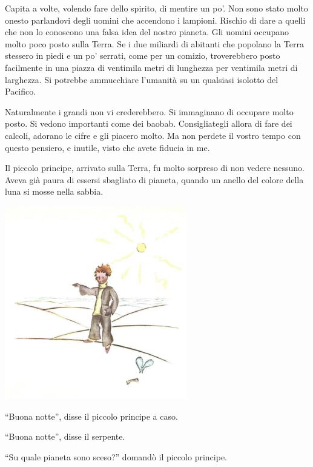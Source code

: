 \documentclass[11pt]{scrbook}
\begin{document}
Capita a volte, volendo fare dello spirito, di mentire un po'. Non sono stato molto onesto parlandovi degli uomini che accendono i lampioni. Rischio di dare a quelli che non lo conoscono una falsa idea del nostro pianeta. Gli uomini occupano molto poco posto sulla Terra. Se i due miliardi di abitanti che popolano la Terra stessero in piedi e un po' serrati, come per un comizio, troverebbero posto facilmente in una piazza di ventimila metri di lunghezza per ventimila metri di larghezza. Si potrebbe ammucchiare l'umanità su un qualsiasi isolotto del Pacifico.

Naturalmente i grandi non vi crederebbero. Si immaginano di occupare molto posto. Si vedono importanti come dei baobab. Consigliategli allora di fare dei calcoli, adorano le cifre e gli piacero molto. Ma non perdete il vostro tempo con questo pensiero, e inutile, visto che avete fiducia in me.

Il piccolo principe, arrivato sulla Terra, fu molto sorpreso di non vedere nessuno. Aveva già paura di essersi sbagliato di pianeta, quando un anello del colore della luna si mosse nella sabbia.

\begin{center}
\includegraphics{img/naZemi}
\end{center}

``Buona notte'', disse il piccolo principe a caso.

``Buona notte'', disse il serpente.

``Su quale pianeta sono sceso?'' domandò il piccolo principe.
\end{document}
